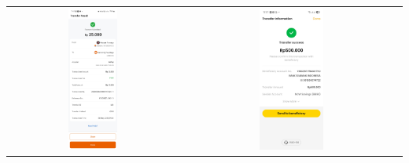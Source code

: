 \begin{table}[htbp]
\begin{tabular}{cc}
        \includegraphics[width=0.3\textwidth]{images/contoh-data/tf-3.jpg} & \includegraphics[width=0.3\textwidth]{images/contoh-data/tf-4.jpg} \\
    \end{tabular}
\end{table}

